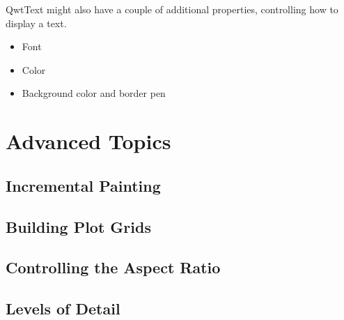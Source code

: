 \documentclass[12pt,a4paper]{book}
\begin{document}
QwtText might also have a couple of additional properties, controlling how to display a text.

\begin{itemize}
\item Font
\item Color
\item Background color and border pen
\end{itemize}


\chapter{Advanced Topics}

\section{Incremental Painting}

\section{Building Plot Grids}

\section{Controlling the Aspect Ratio}

\section{Levels of Detail}
\end{document}
